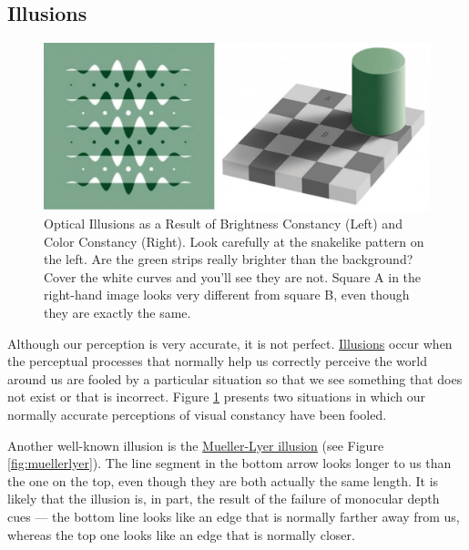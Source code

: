 \documentclass[
]{krantz}
\begin{document}
\subsection*{Illusions}\label{illusions}


\begin{figure}

{\centering \includegraphics[width=0.6\linewidth]{images/ch2/fig4} 

}

\caption{Optical Illusions as a Result of Brightness Constancy (Left) and Color Constancy (Right). Look carefully at the snakelike pattern on the left. Are the green strips really brighter than the background? Cover the white curves and you’ll see they are not. Square A in the right-hand image looks very different from square B, even though they are exactly the same.}\label{fig:constancy}
\end{figure}

Although our perception is very accurate, it is not perfect. \hyperref[illusions]{Illusions} occur when the perceptual processes that normally help us correctly perceive the world around us are fooled by a particular situation so that we see something that does not exist or that is incorrect. Figure \ref{fig:constancy} presents two situations in which our normally accurate perceptions of visual constancy have been fooled.

Another well-known illusion is the \hyperref[mueller-lyer-illusion]{Mueller-Lyer illusion} (see Figure \ref{fig:muellerlyer}). The line segment in the bottom arrow looks longer to us than the one on the top, even though they are both actually the same length. It is likely that the illusion is, in part, the result of the failure of monocular depth cues --- the bottom line looks like an edge that is normally farther away from us, whereas the top one looks like an edge that is normally closer.
\end{document}
